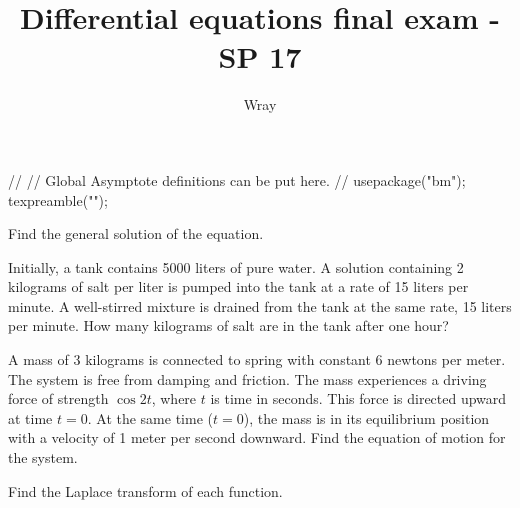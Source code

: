 \documentclass[12pt]{exam}
\title{Differential equations final exam - SP 17}
\author{Wray}
\begin{document}
\begin{asydef}
//
// Global Asymptote definitions can be put here.
//
usepackage("bm");
texpreamble("\def\V#1{\bm{#1}}");
\end{asydef}

\bigskip
\bigskip

\begin{questions}

\question[10]
Find the general solution of the equation.


\question[12]
Initially, a tank contains 5000 liters of pure water.  A solution containing 2 kilograms of salt per liter is pumped into the tank at a rate of 15 liters per minute. A well-stirred mixture is drained from the tank at the same rate, 15 liters per minute.  How many kilograms of salt are in the tank after one hour?
\clearpage

\question[22]
A mass of 3 kilograms is connected to spring with constant 6 newtons per meter.  The system is free from damping and friction.  The mass experiences a driving force of strength
$\cos 2t$, where $t$ is time in seconds.  This force is directed upward at time $t=0$.  At the same time ($t=0$), the mass is in its equilibrium position with a velocity of 1 meter per second downward.  Find the equation of motion for the system.
\clearpage 

\question[10]
Find the Laplace transform of each function.
\end{questions}
\end{document}
